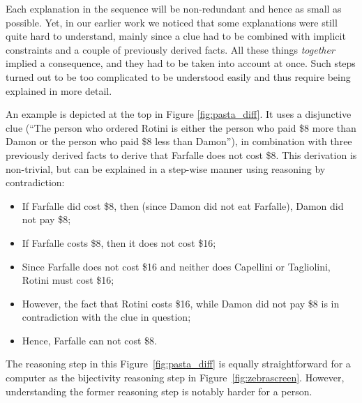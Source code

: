 Each explanation in the sequence will be non-redundant and hence as small as possible. Yet, in our earlier work we noticed that some explanations were still quite hard to understand, mainly since a clue had to be combined with implicit constraints and a couple of previously derived facts. All these things \textit{together} implied a consequence, and they had to be taken into account at once.
Such steps turned out to be too complicated to be understood easily and thus require being explained in more detail.

An example is depicted at the top in Figure \ref{fig:pasta_diff}.
It uses a disjunctive clue (``The person who ordered Rotini is either the person who paid \$8 more than Damon or the person who paid \$8 less than Damon''), in combination with three previously derived facts to derive that Farfalle does not cost \$8.
This derivation is non-trivial, but can be explained in a step-wise manner using reasoning by contradiction:
 \begin{itemize}
  \item If Farfalle did cost \$8, then (since Damon did not eat Farfalle), Damon did not pay \$8;
  \item If Farfalle costs \$8, then it does not cost \$16; 
  \item Since Farfalle does not cost \$16 and neither does Capellini or Tagliolini, Rotini must cost \$16;
  \item However, the fact that Rotini costs \$16, while Damon did not pay \$8 is in contradiction with the clue in question;
  \item Hence, Farfalle can not cost \$8.
 \end{itemize}
The reasoning step in this Figure~\ref{fig:pasta_diff} is equally straightforward for a computer as the bijectivity reasoning step in Figure~\ref{fig:zebrascreen}. However, understanding the former reasoning step is notably harder for a person. %


